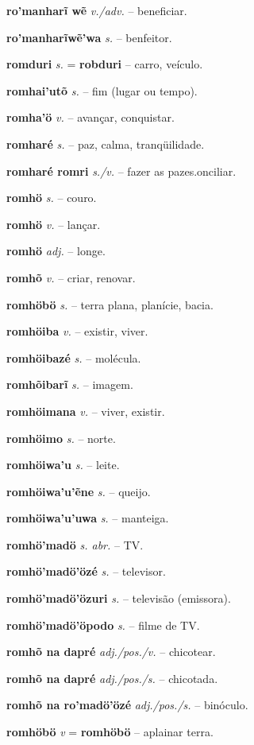\textbf{ro'manharĩ wẽ} \textit{v./adv.} -- beneficiar.

\textbf{ro'manharĩwẽ'wa} \textit{s.} -- benfeitor.

\textbf{romduri} \textit{s.} = \textbf{robduri} -- carro, veículo.

\textbf{romhai'utõ} \textit{s.} -- fim (lugar ou tempo).

\textbf{romha'ö} \textit{v.} -- avançar, conquistar.

\textbf{romharé} \textit{s.} -- paz, calma, tranqüilidade.

\textbf{romharé romri} \textit{s./v.} -- fazer as pazes.onciliar.

\textbf{romhö} \textit{s.} -- couro.

\textbf{romhö} \textit{v.} -- lançar.

\textbf{romhö} \textit{adj.} -- longe.

\textbf{romhõ} \textit{v.} -- criar, renovar.

\textbf{romhöbö} \textit{s.} -- terra plana, planície, bacia.

\textbf{romhöiba} \textit{v.} -- existir, viver.

\textbf{romhöibazé} \textit{s.} -- molécula.

\textbf{romhõibarĩ} \textit{s.} -- imagem.

\textbf{romhöimana} \textit{v.} -- viver, existir.

\textbf{romhöimo} \textit{s.} -- norte.

\textbf{romhöiwa'u} \textit{s.} -- leite.

\textbf{romhöiwa'u'ẽne} \textit{s.} -- queijo.

\textbf{romhöiwa'u'uwa} \textit{s.} -- manteiga.

\textbf{romhö'madö} \textit{s. abr.} -- TV.

\textbf{romhö'madö'özé} \textit{s.} -- televisor.

\textbf{romhö'madö'özuri} \textit{s.} -- televisão (emissora).

\textbf{romhö'madö'öpodo} \textit{s.} -- filme de TV.

\textbf{romhõ na dapré} \textit{adj./pos./v.} -- chicotear.

\textbf{romhõ na dapré} \textit{adj./pos./s.} -- chicotada.

\textbf{romhõ na ro'madö'özé} \textit{adj./pos./s.} -- binóculo.

\textbf{romhöbö} \textit{v} = \textbf{romhöbö} -- aplainar terra.

